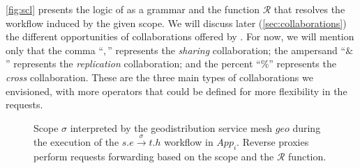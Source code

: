 \autoref{fig:scl} presents the logic of \scl as a grammar and the
function $\mathcal{R}$ that resolves the workflow induced by the given
scope.
%
We will discuss later (\autoref{sec:collaborations}) the different
opportunities of collaborations offered by \scl.
%
For now, we will mention only that the comma ``$,$'' represents the
\emph{sharing} collaboration; the ampersand ``$\&$'' represents the
\emph{replication} collaboration; and the percent ``$\%$'' represents
the \emph{cross} collaboration.
%
These are the three main types of collaborations we envisioned, with
more operators that could be defined for more flexibility in the
requests.


\begin{figure}[h!]%
  \centering
  \caption{Scope $\sigma$ interpreted by the geo\hyph{}distribution
    service mesh $geo$ during the execution of the $s.e
    \xrightarrow{\sigma} t.h$ workflow in $App_i$. Reverse proxies
    perform requests forwarding based on the scope and the
    $\mathcal{R}$ function.}
  \label{fig:sm-geo}
\end{figure}


